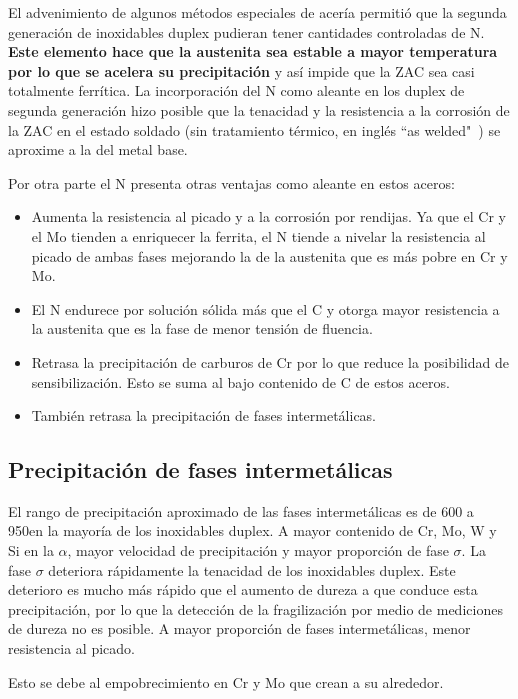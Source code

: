 El advenimiento de algunos métodos especiales de acería permitió que la segunda generación de inoxidables duplex pudieran tener cantidades controladas de N. \textbf{Este elemento hace que la austenita sea estable a mayor temperatura por lo que se acelera su precipitación} y así impide que la ZAC sea casi totalmente ferrítica. La incorporación del N como aleante en los duplex de segunda generación hizo posible que la tenacidad y la resistencia a la corrosión de la ZAC en el estado soldado (sin tratamiento térmico, en inglés ``as welded"~) se aproxime a la del metal base.

Por otra parte el N presenta otras ventajas como aleante en estos aceros:

\begin{itemize}
	\item Aumenta la resistencia al picado y a la corrosión por rendijas. Ya que el Cr y el Mo tienden a enriquecer la ferrita, el N tiende a nivelar la resistencia al picado de ambas fases mejorando la de la austenita que es más pobre en Cr y Mo.
	\item El N endurece por solución sólida más que el C y otorga mayor resistencia a la austenita que es la fase de menor tensión de fluencia.
	\item Retrasa la precipitación de carburos de Cr por lo que reduce la posibilidad de sensibilización. Esto se suma al bajo contenido de C de estos aceros.
	\item También retrasa la precipitación de fases intermetálicas.
\end{itemize}

\subsection{Precipitación de fases intermetálicas}

El rango de precipitación aproximado de las fases intermetálicas es de 600 a 950\grad en la mayoría de los inoxidables duplex. A mayor contenido de Cr, Mo, W y Si en la $\alpha$, mayor velocidad de precipitación y mayor proporción de fase $\sigma$. La fase $\sigma$ deteriora rápidamente la tenacidad de los inoxidables duplex. Este deterioro es mucho más rápido que el aumento de dureza a que conduce esta precipitación, por lo que la detección de la fragilización por medio de mediciones de dureza no es posible. A mayor proporción de fases intermetálicas, menor resistencia al picado. 

Esto se debe al empobrecimiento en Cr y Mo que crean a su alrededor.

